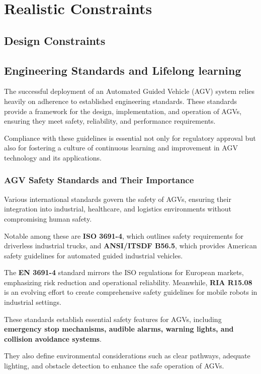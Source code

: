 \documentclass[../../main]{subfiles}
\begin{document}
\chapter{Realistic Constraints}
\section{Design Constraints}
\section{Engineering Standards and Lifelong learning}
The successful deployment of an Automated Guided Vehicle (AGV) system relies heavily on adherence to established engineering standards.  
These standards provide a framework for the design, implementation, 
and operation of AGVs, ensuring they meet safety, reliability, 
and performance requirements. 

Compliance with these guidelines is essential not only for regulatory 
approval but also for fostering a culture of continuous learning and 
improvement in AGV technology and its applications.

\subsection{AGV Safety Standards and Their Importance}

Various international standards govern the safety of AGVs, ensuring 
their integration into industrial, healthcare, and logistics environments 
without compromising human safety. 

Notable among these are \textbf{ISO 3691-4}\cite{ISO3691-4:2020}, which outlines safety 
requirements for driverless industrial trucks, and \textbf{ANSI/ITSDF B56.5}\cite{ANSIITSDFB56.5}, 
which provides American safety guidelines for automated guided industrial 
vehicles. 

The \textbf{EN 3691-4}\cite{EN3691-4} standard mirrors the ISO regulations for European markets, 
emphasizing risk reduction and operational reliability. Meanwhile, 
\textbf{RIA R15.08} \cite{RIAR15.08}is an evolving effort to create comprehensive safety 
guidelines for mobile robots in industrial settings.

These standards establish essential safety features for AGVs, including 
\textbf{emergency stop mechanisms, audible alarms, warning lights, 
and collision avoidance systems}. 

They also define environmental considerations such as clear pathways, 
adequate lighting, and obstacle detection to enhance the safe operation 
of AGVs. 
\end{document}

